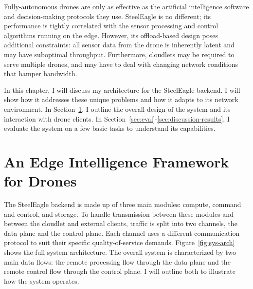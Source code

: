 Fully-autonomous drones are only as effective as the artificial intelligence software and decision-making protocols they use. SteelEagle is no different; its performance is tightly correlated with the sensor processing and control algorithms running on the edge. However, its offload-based design poses additional constraints: all sensor data from the drone is inherently latent and may have suboptimal throughput. Furthermore, cloudlets may be required to serve multiple drones, and may have to deal with changing network conditions that hamper bandwidth.

In this chapter, I will discuss my architecture for the SteelEagle backend. I will show how it addresses these unique problems and how it adapts to its network environment. In Section~\ref{sec:remote-intelligence-framework}, I outline the overall design of the system and its interaction with drone clients. In Section~\ref{sec:eval}-\ref{sec:discussion-results}, I evaluate the system on a few basic tasks to understand its capabilities.

\section{An Edge Intelligence Framework for Drones}
\label{sec:remote-intelligence-framework}
The SteelEagle backend is made up of three main modules: compute, command and control, and storage. To handle transmission between these modules and between the cloudlet and external clients, traffic is split into two channels, the data plane and the control plane. Each channel uses a different communication protocol to suit their specific quality-of-service demands. Figure~\ref{fig:sys-arch} shows the full system architecture. The overall system is characterized by two main data flows: the remote processing flow through the data plane and the remote control flow through the control plane. I will outline both to illustrate how the system operates.

